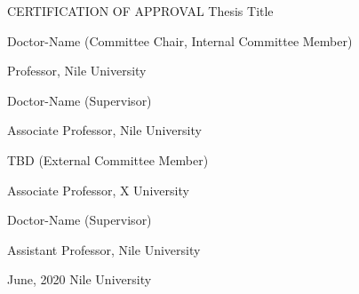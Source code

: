 \begin{center}
CERTIFICATION OF APPROVAL
\vskip 30pt
Thesis Title
\end{center}
\vskip 50pt

\makebox[5in][c]{\leaders\hrule\hskip 5in}

Doctor-Name (Committee Chair, Internal Committee Member)

Professor, Nile University
\vskip 20pt

\makebox[5in][c]{\leaders\hrule\hskip 5in}

Doctor-Name (Supervisor)

Associate Professor, Nile University
\vskip 20pt

\makebox[5in][c]{\leaders\hrule\hskip 5in}

TBD (External Committee Member)

Associate Professor, X University
\vskip 20pt

\makebox[5in][c]{\leaders\hrule\hskip 5in}

Doctor-Name (Supervisor)

Assistant Professor, Nile University
\vskip 20pt


\begin{center}
June, 2020
\vskip 10pt
Nile University
\end{center} 